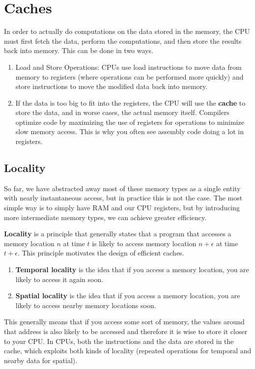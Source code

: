 \section{Caches} 

  In order to actually do computations on the data stored in the memory, the CPU must first fetch the data, perform the computations, and then store the results back into memory. This can be done in two ways.

  \begin{enumerate}
    \item Load and Store Operations: CPUs use load instructions to move data from memory to registers (where operations can be performed more quickly) and store instructions to move the modified data back into memory.
    \item If the data is too big to fit into the registers, the CPU will use the \textbf{cache} to store the data, and in worse cases, the actual memory itself. Compilers optimize code by maximizing the use of registers for operations to minimize slow memory access. This is why you often see assembly code doing a lot in registers.
  \end{enumerate}

\subsection{Locality}

  So far, we have abstracted away most of these memory types as a single entity with nearly instantaneous access, but in practice this is not the case. The most simple way is to simply have RAM and our CPU registers, but by introducing more intermediate memory types, we can achieve greater efficiency. 

  \begin{definition}[Locality]
    \textbf{Locality} is a principle that generally states that a program that accesses a memory location $n$ at time $t$ is likely to access memory location $n + \epsilon$ at time $t + \epsilon$. This principle motivates the design of efficient caches. 
    \begin{enumerate}
      \item \textbf{Temporal locality} is the idea that if you access a memory location, you are likely to access it again soon. 
      \item \textbf{Spatial locality} is the idea that if you access a memory location, you are likely to access nearby memory locations soon.
    \end{enumerate}
    This generally means that if you access some sort of memory, the values around that address is also likely to be accessed and therefore it is wise to store it closer to your CPU. In CPUs, both the instructions and the data are stored in the cache, which exploits both kinds of locality (repeated operations for temporal and nearby data for spatial). 
  \end{definition}

